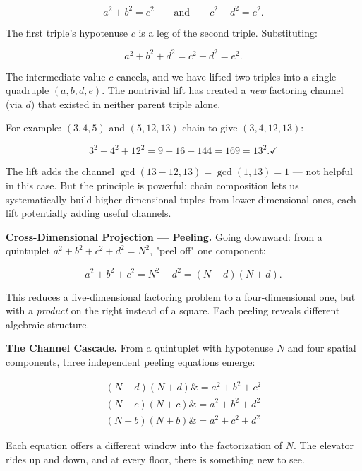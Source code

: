 \documentclass[11pt,openright,twoside]{book}
\theoremstyle{definition}
\begin{document}
\[a^2 + b^2 = c^2 \qquad \text{and} \qquad c^2 + d^2 = e^2.\]

The first triple's hypotenuse $c$ is a leg of the second triple. Substituting:

\[a^2 + b^2 + d^2 = c^2 + d^2 = e^2.\]

The intermediate value $c$ cancels, and we have lifted two triples into a single quadruple $(a, b, d, e)$. The nontrivial lift has created a \textit{new} factoring channel (via $d$) that existed in neither parent triple alone.

For example: $(3, 4, 5)$ and $(5, 12, 13)$ chain to give $(3, 4, 12, 13)$:

\[3^2 + 4^2 + 12^2 = 9 + 16 + 144 = 169 = 13^2. \checkmark\]

The lift adds the channel $\gcd(13 - 12, 13) = \gcd(1, 13) = 1$ --- not helpful in this case. But the principle is powerful: chain composition lets us systematically build higher-dimensional tuples from lower-dimensional ones, each lift potentially adding useful channels.

\textbf{Cross-Dimensional Projection --- Peeling.} Going downward: from a quintuplet $a^2 + b^2 + c^2 + d^2 = N^2$, "peel off" one component:

\[a^2 + b^2 + c^2 = N^2 - d^2 = (N - d)(N + d).\]

This reduces a five-dimensional factoring problem to a four-dimensional one, but with a \textit{product} on the right instead of a square. Each peeling reveals different algebraic structure.

\textbf{The Channel Cascade.} From a quintuplet with hypotenuse $N$ and four spatial components, three independent peeling equations emerge:

$$\begin{aligned}
(N - d)(N + d) \&= a^2 + b^2 + c^2 \\
(N - c)(N + c) \&= a^2 + b^2 + d^2 \\
(N - b)(N + b) \&= a^2 + c^2 + d^2
\end{aligned}$$

Each equation offers a different window into the factorization of $N$. The elevator rides up and down, and at every floor, there is something new to see.
\end{document}
